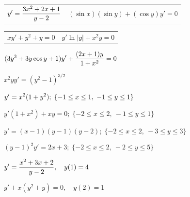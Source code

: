 \begin{exerciselist}
  \begin{tabular}[t]{ @{}p{168pt}@{}p{168pt}}
    \item\label{exer:2.2.1} $\displaystyle{y'=\frac{3x^{2}+2x+1}{y-2}}$ &
    \item\label{exer:2.2.2}\vspace*{18pt} $(\sin x)(\sin y)+(\cos y)y'=0$
  \end{tabular}

  \begin{tabular}[t]{@{}p{168pt}@{}p{168pt}}
    \item\label{exer:2.2.3} $xy'+y^{2}+y=0$ &
    \item\label{exer:2.2.4} $y'\ln|y|+x^{2}y=0$
  \end{tabular}

  \item\label{exer:2.2.5} $\displaystyle{(3y^{3}+3y\cos y+1)y'+\frac{(2x+1)y}{1+x^{2}}=0}$

  \item\label{exer:2.2.6} $x^{2}yy'=(y^{2}-1)^{3/2}$


  \item\label{exer:2.2.7} \CGex $\displaystyle{y'=x^{2}(1+y^{2})};\;\{-1\le x\le1,\
-1\le y\le1\}$

  \item\label{exer:2.2.8} \CGex$y'(1+x^{2})+xy=0;\;\{-2\le x\le2,\ -1\le y\le1\}$

  \item\label{exer:2.2.9} \CGex $y'=(x-1)(y-1)(y-2);\;\{-2\le x\le2,\
-3\le y\le3\}$

  \item\label{exer:2.2.10} \CGex $(y-1)^{2}y'=2x+3;\;\{-2\le x\le2,\ -2\le y\le5\}$


  \item\label{exer:2.2.11} $\displaystyle{y'=\frac{x^{2}+3x+2}{y-2},\quad y(1)=4}$

  \item\label{exer:2.2.12} $y'+x(y^{2}+y)=0,\quad y(2)=1$



\end{exerciselist}
